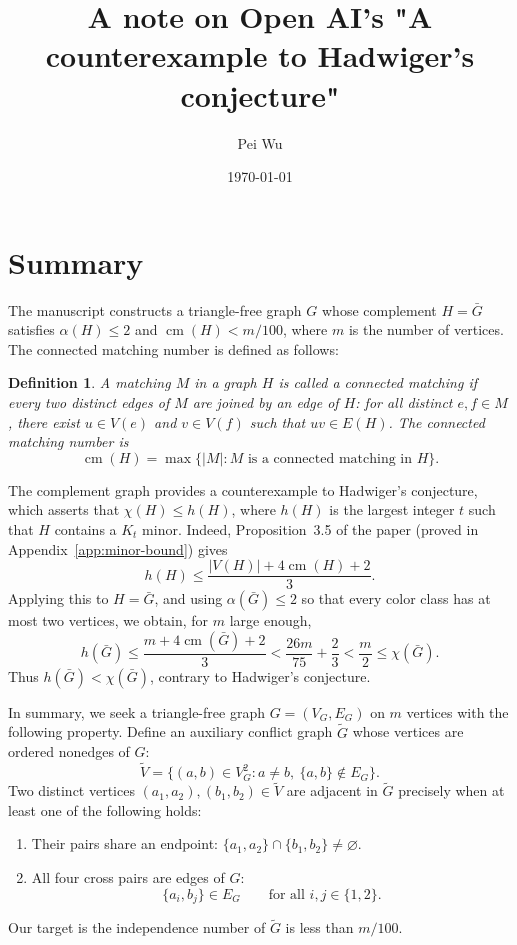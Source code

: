 \documentclass[11pt]{article}
\title{A note on Open AI's "A counterexample to Hadwiger’s conjecture"}
\author{Pei Wu}
\date{\today}
\newtheorem{defn}[theorem]{Definition}
\newcommand{\cm}{\operatorname{cm}}
\begin{document}
	
	\maketitle
	
	\section{Summary}
	The manuscript constructs a triangle-free graph $G$ whose complement $H=\bar G$ satisfies $\alpha(H)\le2$ and $\cm(H)<m/100$, where $m$ is the number of vertices. The connected matching number is defined as follows:
	
	\begin{defn}
		A matching $M$ in a graph $H$ is called a \emph{connected matching} if every two distinct edges of $M$ are joined by an edge of $H$: for all distinct $e,f\in M$, there exist $u\in V(e)$ and $v\in V(f)$ such that $uv\in E(H)$. The \emph{connected matching number} is
	\[
	\cm(H)=\max\bigl\{|M|: M\text{ is a connected matching in }H\bigr\}.
	\]
	\end{defn}
	
	The complement graph provides a counterexample to Hadwiger's conjecture, which asserts that $\chi(H)\le h(H)$, where $h(H)$ is the largest integer $t$ such that $H$ contains a $K_t$ minor. Indeed, Proposition~3.5 of the paper (proved in Appendix~\ref{app:minor-bound}) gives
	\[
	h(H)\le \frac{|V(H)|+4\cm(H)+2}{3}.
	\]
	Applying this to $H=\bar G$, and using $\alpha(\bar G)\le 2$ so that every color class has at most two vertices, we obtain, for $m$ large enough,
	\[
	h(\bar G)
	\le \frac{m+4\cm(\bar G)+2}{3}
	< \frac{26m}{75}+\frac{2}{3}
	< \frac{m}{2}
	\le \chi(\bar G).
	\]
	Thus $h(\bar G)<\chi(\bar G)$, contrary to Hadwiger's conjecture.
	
In summary, we seek a triangle-free graph $G=(V_G,E_G)$ on $m$ vertices with the following property. Define an auxiliary conflict graph $\widetilde G$ whose vertices are ordered nonedges of $G$:
\[
\widetilde V=\{(a,b)\in V_G^2:a\ne b,\ \{a,b\}\notin E_G\}.
\]
Two distinct vertices $(a_1,a_2),(b_1,b_2)\in\widetilde V$ are adjacent in $\widetilde G$ precisely when at least one of the following holds:
\begin{enumerate}
\item Their pairs share an endpoint: $\{a_1,a_2\}\cap\{b_1,b_2\}\ne\varnothing$.
\item All four cross pairs are edges of $G$:
\[
\{a_i,b_j\}\in E_G\qquad\text{for all }i,j\in\{1,2\}.
\]
\end{enumerate}
Our target is the independence number of $\tilde{G}$ is less than $m/100$. 
\end{document}
